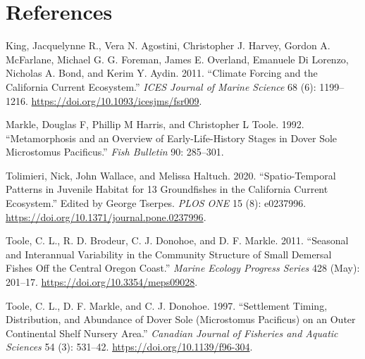 \documentclass[11pt,
  english,
  a4paper,
]{article}
\begin{document}
\clearpage


\hypertarget{references}{%
\section{References}\label{references}}

\leavevmode\tagmcend\tagstructend


\hypertarget{refs}{}
\begin{cslreferences}
\leavevmode\hypertarget{ref-king_climate_2011}{}%
King, Jacquelynne R., Vera N. Agostini, Christopher J. Harvey, Gordon A. McFarlane, Michael G. G. Foreman, James E. Overland, Emanuele Di Lorenzo, Nicholas A. Bond, and Kerim Y. Aydin. 2011. ``Climate Forcing and the California Current Ecosystem.'' \emph{ICES Journal of Marine Science} 68 (6): 1199--1216. \url{https://doi.org/10.1093/icesjms/fsr009}.

\leavevmode\hypertarget{ref-markle_metamorphosis_1992}{}%
Markle, Douglas F, Phillip M Harris, and Christopher L Toole. 1992. ``Metamorphosis and an Overview of Early-Life-History Stages in Dover Sole Microstomus Pacificus.'' \emph{Fish Bulletin} 90: 285--301.

\leavevmode\hypertarget{ref-tolimieri_spatio-temporal_2020}{}%
Tolimieri, Nick, John Wallace, and Melissa Haltuch. 2020. ``Spatio-Temporal Patterns in Juvenile Habitat for 13 Groundfishes in the California Current Ecosystem.'' Edited by George Tserpes. \emph{PLOS ONE} 15 (8): e0237996. \url{https://doi.org/10.1371/journal.pone.0237996}.

\leavevmode\hypertarget{ref-toole_seasonal_2011}{}%
Toole, C. L., R. D. Brodeur, C. J. Donohoe, and D. F. Markle. 2011. ``Seasonal and Interannual Variability in the Community Structure of Small Demersal Fishes Off the Central Oregon Coast.'' \emph{Marine Ecology Progress Series} 428 (May): 201--17. \url{https://doi.org/10.3354/meps09028}.

\leavevmode\hypertarget{ref-toole_settlement_1997}{}%
Toole, C. L., D. F. Markle, and C. J. Donohoe. 1997. ``Settlement Timing, Distribution, and Abundance of Dover Sole (Microstomus Pacificus) on an Outer Continental Shelf Nursery Area.'' \emph{Canadian Journal of Fisheries and Aquatic Sciences} 54 (3): 531--42. \url{https://doi.org/10.1139/f96-304}.
\end{cslreferences}

\leavevmode\tagmcend\tagstructend
\end{document}
